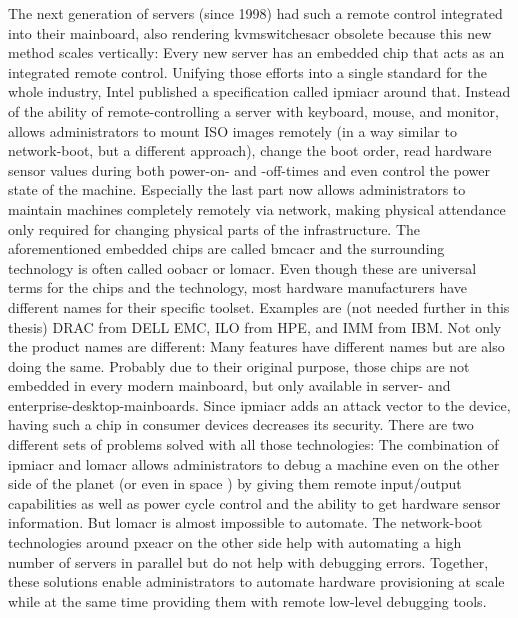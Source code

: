 The next generation of servers (since 1998) had such a remote control integrated into their mainboard, also rendering \gls{kvmswitchesacr} obsolete because this new method scales vertically: Every new server has an embedded chip that acts as an integrated remote control. Unifying those efforts into a single standard for the whole industry, Intel published a specification called \gls{ipmiacr} around that. Instead of  the ability of remote-controlling a server with keyboard, mouse, and monitor,  allows administrators to mount ISO images remotely (in a way similar to network-boot, but a different approach), change the boot order, read hardware sensor values during both power-on- and -off-times and even control the power state of the machine. Especially the last part now allows administrators to maintain machines completely remotely via network, making physical attendance only required for changing physical parts of the infrastructure. 
The aforementioned embedded chips are called \gls{bmcacr} and the surrounding technology is often called \gls{oobacr} or \gls{lomacr}. Even though these are universal terms for the chips and the technology, most hardware manufacturers have different names for their specific toolset. Examples are (not needed further in this thesis) DRAC from DELL EMC, ILO from HPE, and IMM from IBM. Not only the product names are different: Many features have different names but are also doing the same. Probably due to their original purpose, those chips are not embedded in every modern mainboard, but only available in server- and enterprise-desktop-mainboards. Since \gls{ipmiacr} adds an attack vector to the device, having such a chip in consumer devices decreases its security.
\newline
There are two different sets of problems solved with all those technologies:
The combination of \gls{ipmiacr} and \gls{lomacr} allows administrators to debug a machine even on the other side of the planet (or even in space \cite{spacex_servers}) by giving them remote input/output capabilities as well as power cycle control and the ability to get hardware sensor information. But \gls{lomacr} is almost impossible to automate. %
The network-boot technologies around \gls{pxeacr} on the other side help with automating a high number of servers in parallel but do not help with debugging errors.
\newline
Together, these solutions enable administrators to automate hardware provisioning at scale while at the same time providing them with remote low-level debugging tools.
